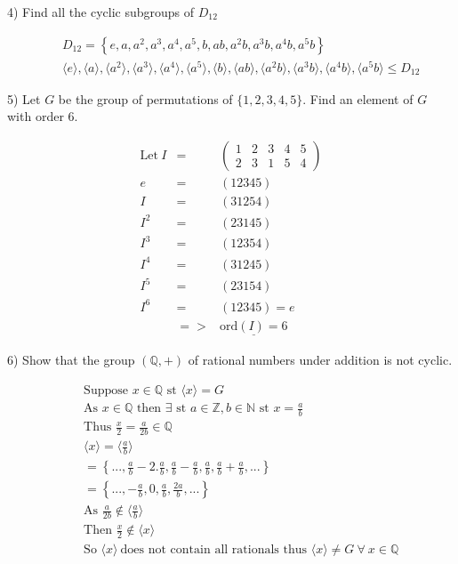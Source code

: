 \documentclass[11pt]{article}
\begin{document}
\newpage
\begin{flushleft} 4) Find all the cyclic subgroups of $D_{12}$
\end{flushleft}
\begin{eqnarray*}
&&D_{12}=\left\{e,a,a^2,a^3,a^4,a^5,b,ab,a^2b,a^3b,a^4b,a^5b\right\}\\
&&\langle e \rangle ,\langle a \rangle ,\langle a^2 \rangle ,\langle a^3 \rangle ,\langle a^4 \rangle ,\langle a^5 \rangle ,\langle b \rangle ,\langle ab \rangle ,\langle a^2b \rangle ,\langle a^3b \rangle ,\langle a^4b \rangle ,\langle a^5b \rangle \le D_{12}
\end{eqnarray*}

\begin{flushleft}
 5) Let $G$ be the group of permutations of $\{ 1,2,3,4,5 \}$. Find an element of $G$ with order 6.
\end{flushleft}
\begin{eqnarray*}
\mathrm{Let}\ I &=&
\begin{pmatrix}
1 & 2 & 3 & 4 & 5\\
2 & 3 & 1 & 5 & 4
\end{pmatrix}\\
e&=&(12345)\\
I&=&(31254)\\
I^2&=&(23145)\\
I^3&=&(12354)\\
I^4&=&(31245)\\
I^5&=&(23154)\\
I^6&=&(12345)=e\\
&=>&\underline{\mathrm{ord}(I)=6}
\end{eqnarray*}

\begin{flushleft}
 6) Show that the group $(\mathbb{Q}, +)$ of rational numbers under addition is not cyclic.
\end{flushleft}
\begin{eqnarray*}
&&\text{Suppose } x \in \mathbb{Q} \text{ st } \langle x \rangle = G\\
%
&&\text{As } x \in \mathbb{Q} \text{ then } \exists \text{ st } a \in \mathbb{Z}, b \in \mathbb{N} \text{ st } x=\frac{a}{b}\\
%
&&\text{Thus } \frac{x}{2} = \frac{a}{2b} \in \mathbb{Q}\\
%
&&\langle x \rangle = \langle \frac{a}{b} \rangle\\
%
&&= \left\{...,\frac{a}{b}-2.\frac{a}{b}, \frac{a}{b}-\frac{a}{b},\frac{a}{b},\frac{a}{b}+\frac{a}{b},...\right\}\\
%
&&=\left\{...,-\frac{a}{b},0,\frac{a}{b},\frac{2a}{b},...\right\}\\
%
&&\text{As } \frac{a}{2b} \not \in \langle \frac{a}{b} \rangle\\
%
&&\text{Then } \frac{x}{2} \not \in \langle x \rangle\\
%
&&\text{So } \langle x \rangle\ \text{does not contain all rationals thus }\langle x \rangle \not = G\ \forall\ x \in \mathbb{Q}
%
\end{eqnarray*}
\end{document}
